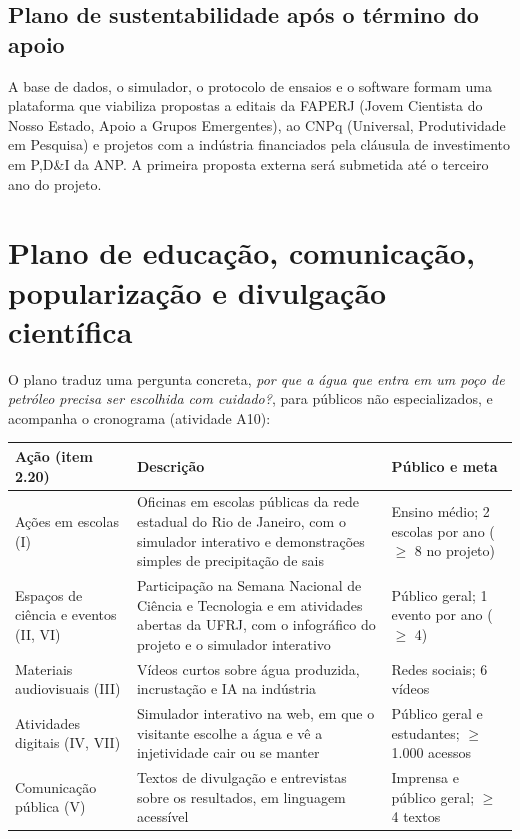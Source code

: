\documentclass[10pt,a4paper]{article}
\newcommand{\itemedital}[1]{}
\begin{document}
\subsection{Plano de sustentabilidade após o término do apoio}\label{sec:sustentabilidade}\itemedital{2.17; Anexo 1 F}
A base de dados, o simulador, o
        protocolo de ensaios e o software formam uma plataforma que viabiliza
        propostas a editais da FAPERJ (Jovem Cientista do Nosso Estado, Apoio a Grupos
        Emergentes), ao CNPq (Universal, Produtividade em Pesquisa) e projetos com a indústria
        financiados pela cláusula de investimento em P,D\&I da ANP. A primeira proposta externa
        será submetida até o terceiro ano do projeto.

\section{Plano de educação, comunicação, popularização e divulgação científica}\label{sec:divulgacao}\itemedital{2.18--2.20; critério 5}
O plano traduz uma pergunta concreta, \textit{por que a água que entra em um poço de petróleo
precisa ser escolhida com cuidado?}, para públicos não especializados, e acompanha o
cronograma (atividade A10):

\begin{center}
\small
\begin{tabularx}{\textwidth}{@{}>{\raggedright\arraybackslash}p{}>{\raggedright\arraybackslash}X>{\raggedright\arraybackslash}p{}@{}}
\toprule
\textbf{Ação (item 2.20)} & \textbf{Descrição} & \textbf{Público e meta} \\
\midrule
Ações em escolas (I) & Oficinas em escolas públicas da rede estadual do Rio de Janeiro, com o simulador interativo e demonstrações simples de precipitação de sais & Ensino médio; 2 escolas por ano ($\geq$ 8 no projeto) \\
Espaços de ciência e eventos (II, VI) & Participação na Semana Nacional de Ciência e Tecnologia e em atividades abertas da UFRJ, com o infográfico do projeto e o simulador interativo & Público geral; 1 evento por ano ($\geq$ 4) \\
Materiais audiovisuais (III) & Vídeos curtos sobre água produzida, incrustação e IA na indústria & Redes sociais; 6 vídeos \\
Atividades digitais (IV, VII) & Simulador interativo na web, em que o visitante escolhe a água e vê a injetividade cair ou se manter & Público geral e estudantes; $\geq$ 1.000 acessos \\
Comunicação pública (V) & Textos de divulgação e entrevistas sobre os resultados, em linguagem acessível & Imprensa e público geral; $\geq$ 4 textos \\
\bottomrule
\end{tabularx}
\end{center}
\end{document}
